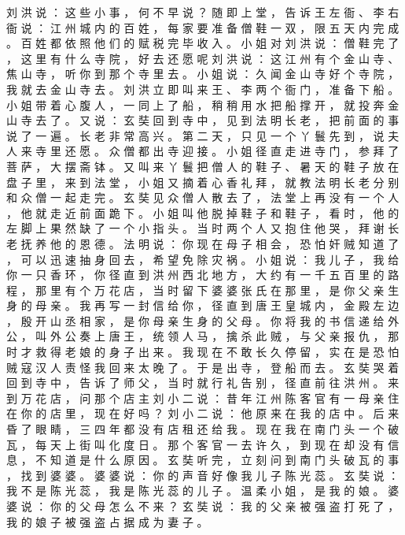 {刘 洪 说 ： 这 些 小 事 ， 何 不 早 说 ？ 随 即 上 堂 ， 告 诉 王 左 衙 、 李 右 衙 说 ： 江 州 城 内 的 百 姓 ， 每 家 要 准 备 僧 鞋 一 双 ， 限 五 天 内 完 成 。
百 姓 都 依 照 他 们 的 赋 税 完 毕 收 入 。
小 姐 对 刘 洪 说 ： 僧 鞋 完 了 ， 这 里 有 什 么 寺 院 ， 好 去 还 愿 呢 刘 洪 说 ： 这 江 州 有 个 金 山 寺 、 焦 山 寺 ， 听 你 到 那 个 寺 里 去 。
小 姐 说 ： 久 闻 金 山 寺 好 个 寺 院 ， 我 就 去 金 山 寺 去 。
刘 洪 立 即 叫 来 王 、 李 两 个 衙 门 ， 准 备 下 船 。
小 姐 带 着 心 腹 人 ， 一 同 上 了 船 ， 稍 稍 用 水 把 船 撑 开 ， 就 投 奔 金 山 寺 去 了 。
又 说 ： 玄 奘 回 到 寺 中 ， 见 到 法 明 长 老 ， 把 前 面 的 事 说 了 一 遍 。
长 老 非 常 高 兴 。
第 二 天 ， 只 见 一 个 丫 鬟 先 到 ， 说 夫 人 来 寺 里 还 愿 。
众 僧 都 出 寺 迎 接 。
小 姐 径 直 走 进 寺 门 ， 参 拜 了 菩 萨 ， 大 摆 斋 钵 。
又 叫 来 丫 鬟 把 僧 人 的 鞋 子 、 暑 天 的 鞋 子 放 在 盘 子 里 ， 来 到 法 堂 ， 小 姐 又 摘 着 心 香 礼 拜 ， 就 教 法 明 长 老 分 别 和 众 僧 一 起 走 完 。
玄 奘 见 众 僧 人 散 去 了 ， 法 堂 上 再 没 有 一 个 人 ， 他 就 走 近 前 面 跪 下 。
小 姐 叫 他 脱 掉 鞋 子 和 鞋 子 ， 看 时 ， 他 的 左 脚 上 果 然 缺 了 一 个 小 指 头 。
当 时 两 个 人 又 抱 住 他 哭 ， 拜 谢 长 老 抚 养 他 的 恩 德 。
法 明 说 ： 你 现 在 母 子 相 会 ， 恐 怕 奸 贼 知 道 了 ， 可 以 迅 速 抽 身 回 去 ， 希 望 免 除 灾 祸 。
小 姐 说 ： 我 儿 子 ， 我 给 你 一 只 香 环 ， 你 径 直 到 洪 州 西 北 地 方 ， 大 约 有 一 千 五 百 里 的 路 程 ， 那 里 有 个 万 花 店 ， 当 时 留 下 婆 婆 张 氏 在 那 里 ， 是 你 父 亲 生 身 的 母 亲 。
我 再 写 一 封 信 给 你 ， 径 直 到 唐 王 皇 城 内 ， 金 殿 左 边 ， 殷 开 山 丞 相 家 ， 是 你 母 亲 生 身 的 父 母 。
你 将 我 的 书 信 递 给 外 公 ， 叫 外 公 奏 上 唐 王 ， 统 领 人 马 ， 擒 杀 此 贼 ， 与 父 亲 报 仇 ， 那 时 才 救 得 老 娘 的 身 子 出 来 。
我 现 在 不 敢 长 久 停 留 ， 实 在 是 恐 怕 贼 寇 汉 人 责 怪 我 回 来 太 晚 了 。
于 是 出 寺 ， 登 船 而 去 。
玄 奘 哭 着 回 到 寺 中 ， 告 诉 了 师 父 ， 当 时 就 行 礼 告 别 ， 径 直 前 往 洪 州 。
来 到 万 花 店 ， 问 那 个 店 主 刘 小 二 说 ： 昔 年 江 州 陈 客 官 有 一 母 亲 住 在 你 的 店 里 ， 现 在 好 吗 ？ 刘 小 二 说 ： 他 原 来 在 我 的 店 中 。
后 来 昏 了 眼 睛 ， 三 四 年 都 没 有 店 租 还 给 我 。
现 在 我 在 南 门 头 一 个 破 瓦 ， 每 天 上 街 叫 化 度 日 。
那 个 客 官 一 去 许 久 ， 到 现 在 却 没 有 信 息 ， 不 知 道 是 什 么 原 因 。
玄 奘 听 完 ， 立 刻 问 到 南 门 头 破 瓦 的 事 ， 找 到 婆 婆 。
婆 婆 说 ： 你 的 声 音 好 像 我 儿 子 陈 光 蕊 。
玄 奘 说 ： 我 不 是 陈 光 蕊 ， 我 是 陈 光 蕊 的 儿 子 。
温 柔 小 姐 ， 是 我 的 娘 。
婆 婆 说 ： 你 的 父 母 怎 么 不 来 ？ 玄 奘 说 ： 我 的 父 亲 被 强 盗 打 死 了 ， 我 的 娘 子 被 强 盗 占 据 成 为 妻 子 。
}
